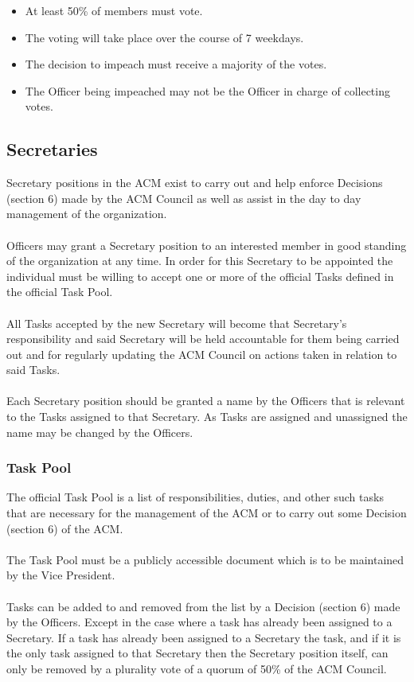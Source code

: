 \documentclass[12pt,titlepage]{article}
\begin{document}
\begin{itemize}
	\item At least 50\% of members must vote.
	\item The voting will take place over the course of 7 weekdays.
	\item The decision to impeach must receive a majority of the votes.
	\item The Officer being impeached may not be the Officer in charge of collecting votes.
\end{itemize}

\subsection{Secretaries}

Secretary positions in the ACM exist to carry out and help enforce Decisions (section 6) made by the ACM Council as well as assist in the day to day management of the organization.\\
\\
Officers may grant a Secretary position to an interested member in good standing of the organization at any time. In order for this Secretary to be appointed the individual must be willing to accept one or more of the official Tasks defined in the official Task Pool.\\
\\
All Tasks accepted by the new Secretary will become that Secretary's responsibility and said Secretary will be held accountable for them being carried out and for regularly updating the ACM Council on actions taken in relation to said Tasks.\\
\\
Each Secretary position should be granted a name by the Officers that is relevant to the Tasks assigned to that Secretary. As Tasks are assigned and unassigned the name may be changed by the Officers.

\subsubsection{Task Pool}

The official Task Pool is a list of responsibilities, duties, and other such tasks that are necessary for the management of the ACM or to carry out some Decision (section 6) of the ACM.\\
\\
The Task Pool must be a publicly accessible document which is to be maintained by the Vice President.\\
\\
Tasks can be added to and removed from the list by a Decision (section 6) made by the Officers. Except in the case where a task has already been assigned to a Secretary. If a task has already been assigned to a Secretary the task, and if it is the only task assigned to that Secretary then the Secretary position itself, can only be removed by a plurality vote of a quorum of 50\% of the ACM Council.
\end{document}
